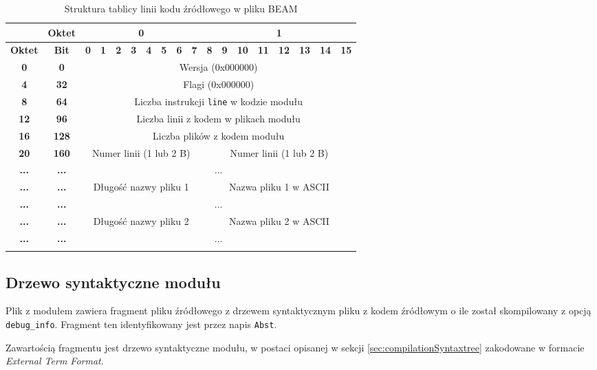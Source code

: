 \begin{longtable}{|c|c|c|c|c|c|c|c|c|c|c|c|c|c|c|c|c|c|}
\hline
         & \textbf{Oktet} & \multicolumn{8}{|c|}{\textbf{0}} & \multicolumn{8}{|c|}{\textbf{1}} \\
\hline
\textbf{Oktet} & \textbf{Bit} & \textbf{0} & \textbf{1} & \textbf{2} & \textbf{3} & \textbf{4} & \textbf{5} & \textbf{6} & \textbf{7} & \textbf{8} & \textbf{9} & \textbf{10} & \textbf{11} & \textbf{12} & \textbf{13} & \textbf{14} & \textbf{15}\\
\hline
\textbf{0} & \textbf{0} & \multicolumn{16}{|c|}{Wersja (0x000000)} \\[3ex]
\hline
\textbf{4} & \textbf{32} & \multicolumn{16}{|c|}{Flagi (0x000000)}\\[3ex]
\hline
\textbf{8} & \textbf{64} & \multicolumn{16}{|c|}{Liczba instrukcji \texttt{line} w kodzie modułu} \\[3ex]
\hline
\textbf{12} & \textbf{96} & \multicolumn{16}{|c|}{Liczba linii z kodem w plikach modułu}\\[3ex]
\hline
\textbf{16} & \textbf{128} & \multicolumn{16}{|c|}{Liczba plików z kodem modułu}\\[3ex]
\hline
\textbf{20} & \textbf{160} & \multicolumn{8}{|c|}{Numer linii (1 lub 2 B)} & \multicolumn{8}{|c|}{Numer linii (1 lub 2 B)} \\[3ex]
\hline
\textbf{...} & \textbf{...} & \multicolumn{16}{|c|}{...}\\[3ex]
\hline
\textbf{...} & \textbf{...} & \multicolumn{8}{|c|}{Długość nazwy pliku 1} & \multicolumn{8}{|c|}{Nazwa pliku 1 w ASCII}\\[3ex]
\hline
\textbf{...} & \textbf{...} & \multicolumn{16}{|c|}{...}\\[3ex]
\hline
\textbf{...} & \textbf{...} & \multicolumn{8}{|c|}{Długość nazwy pliku 2} & \multicolumn{8}{|c|}{Nazwa pliku 2 w ASCII}\\[3ex]
\hline
\textbf{...} & \textbf{...} & \multicolumn{16}{|c|}{...}\\[3ex]
\hline
\caption{Struktura tablicy linii kodu źródłowego w pliku BEAM}
\label{table:linetable} \\
\end{longtable}

\subsection{Drzewo syntaktyczne modułu}
Plik z modułem zawiera fragment pliku źródłowego z drzewem syntaktycznym pliku z kodem źródłowym o ile został skompilowany z opcją \texttt{debug\_info}.
Fragment ten identyfikowany jest przez napis \texttt{Abst}. 

Zawartością fragmentu jest drzewo syntaktyczne modułu, w postaci opisanej w sekcji \ref{sec:compilationSyntaxtree} zakodowane w formacie \emph{External Term Format}.
